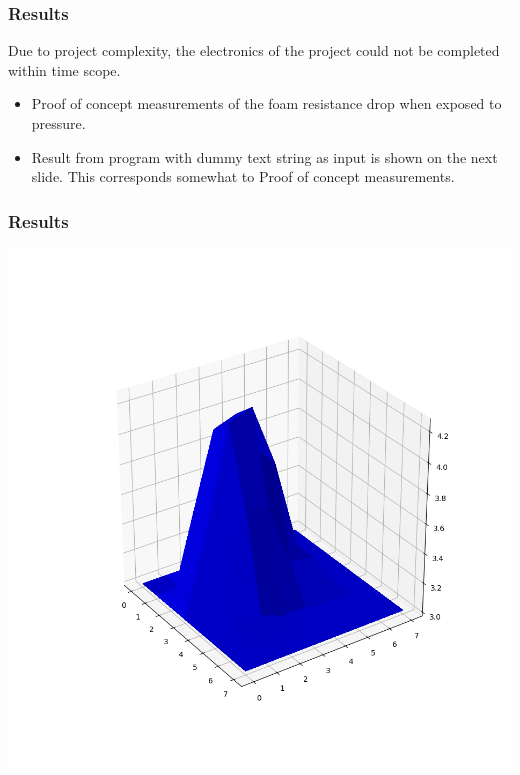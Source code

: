 \documentclass{beamer}
\begin{document}
\begin{frame}
    \frametitle{Results}
    \begin{center}
        Due to project complexity, the electronics of the project could not be completed within time scope.
    \end{center}
    \begin{itemize}
        \item Proof of concept measurements of the foam resistance drop when exposed to pressure.
        \item Result from program with dummy text string as input is shown on the next slide. This corresponds somewhat to Proof of concept measurements.
    \end{itemize}

\end{frame}

\begin{frame}
    \frametitle{Results}
    \begin{center}
        \includegraphics[width=.8\textwidth]{img/foam_plot.png}
    \end{center}

\end{frame}
\end{document}
